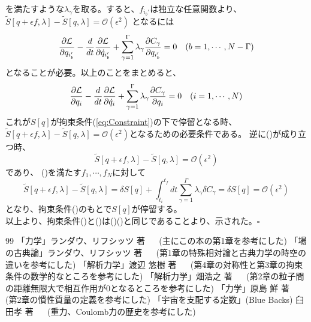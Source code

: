 \documentclass[a4paper,11pt]{ltjsarticle}
\newcommand{\La}{\mathcal{L}}
\newcommand{\intS}{\int_{t_i}^{t_f}dt}
\begin{document}
を満たすような$\lambda_\gamma$を取る。すると、$f_{i_b'}$は独立な任意関数より、$\tilde{S}[q+\epsilon f,\lambda]-\tilde{S}[q,\lambda]=\mathcal{O}(\epsilon^2)$
となるには
\[
\pdv{\La}{q_{i_b'}}-\frac{d}{dt}\pdv{\La}{\dot{q}_{i_b'}}+\sum_{\gamma=1}^{\Gamma}\lambda_\gamma\pdv{C_\gamma}{q_{i_b'}}=0 \quad (b=1,\cdots,N-\Gamma)
\]
となることが必要。以上のことをまとめると、
\begin{equation}
\pdv{\La}{q_i}-\frac{d}{dt}\pdv{\La}{\dot{q}_i}+\sum_{\gamma=1}^{\Gamma}\lambda_\gamma\pdv{C_\gamma}{q_i}=0 \quad (i=1,\cdots,N)
\label{eq:star}
\end{equation}
これが$S[q]$が拘束条件(\ref{eq:Constraint})の下で停留となる時、$\tilde{S}[q+\epsilon f,\lambda]-\tilde{S}[q,\lambda]=\mathcal{O}(\epsilon^2)$となるための必要条件である。
逆に()が成り立つ時、
\[
\tilde{S}[q+\epsilon f,\lambda]-\tilde{S}[q,\lambda]=\mathcal{O}(\epsilon^2)
\]
であり、
()を満たす$f_1,\cdots,f_N$に対して
\[
\tilde{S}[q+\epsilon f,\lambda]-\tilde{S}[q,\lambda]=\delta S[q]+\intS\sum_{\gamma=1}^{\Gamma}\lambda_\gamma\delta C_\gamma=\delta S[q]=\mathcal{O}(\epsilon^2)
\]
となり、拘束条件()のもとで$S[q]$が停留する。
\\以上より、拘束条件()と()は()()と同じであることより、示された。$\square$

\begin{thebibliography}{99}
「力学」ランダウ、リフシッツ 著 $\quad$ (主にこの本の第1章を参考にした)
「場の古典論」ランダウ、リフシッツ 著 $\quad$ (第1章の特殊相対論と古典力学の時空の違いを参考にした)
「解析力学」渡辺 悠樹 著 $\quad$ (第4章の対称性と第3章の拘束条件の数学的なところを参考にした)
「解析力学」畑浩之 著 $\quad$ (第2章の粒子間の距離無限大で相互作用が0となるところを参考にした)
「力学」原島 鮮 著 $\quad$ (第2章の慣性質量の定義を参考にした)
「宇宙を支配する定数」(Blue Backs) 臼田孝 著 $\quad$ (重力、Coulomb力の歴史を参考にした)

\end{thebibliography}
\end{document}

